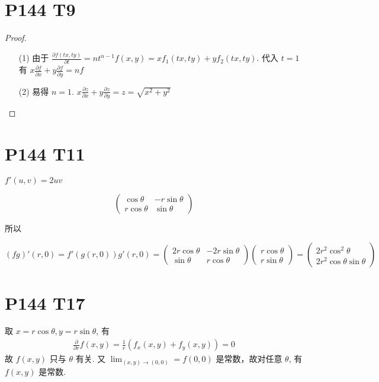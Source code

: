 \documentclass{article}
\begin{document}
\section*{P144 T9}

\begin{proof}
    \begin{itemize}
        \item [(1)] 由于 $\frac{\partial f(tx, ty)}{\partial t} = nt^{n - 1}f(x, y) = xf_1(tx, ty) + yf_2(tx, ty)$. 代入 $t = 1$ 有 $x\frac{\partial f}{\partial x} + y\frac{\partial f}{\partial y} = nf$
        \item [(2)] 易得 $n = 1$. $x\frac{\partial z}{\partial x} + y\frac{\partial z}{\partial y} = z = \sqrt{x^2 + y^2}$
    \end{itemize}
\end{proof}

\section*{P144 T11}

$f'(u,v) = 2uv$ 


 $$
\begin{pmatrix}
\cos \theta & -r \sin \theta \\
r \cos \theta & \sin \theta
\end{pmatrix}
$$ 

所以

 $$
(fg)'(r,0) = f'(g(r,0)) g'(r,0) = 
\begin{pmatrix}
2r \cos \theta & -2r \sin \theta \\
\sin \theta & r \cos \theta
\end{pmatrix}
\begin{pmatrix}
r \cos \theta \\
r \sin \theta
\end{pmatrix}
=
\begin{pmatrix}2r^2 \cos^2 \theta \\
    2r^2 \cos \theta \sin \theta
    \end{pmatrix}
    $$ 

\section*{P144 T17}

取 $x = r\cos \theta, y = r\sin \theta$, 有
\begin{align*}
    \frac{\partial}{\partial r}f(x, y) = \frac{1}{r}(f_x(x, y) + f_y(x, y)) = 0
\end{align*}
故 $f(x, y)$ 只与 $\theta$ 有关. 又 $\lim_{(x, y) \to (0, 0)} = f(0, 0)$ 是常数，故对任意 $\theta$, 有 $f(x, y)$ 是常数.
\end{document}
